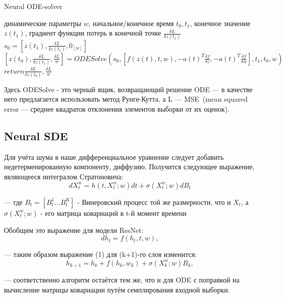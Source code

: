\documentclass{article}
\begin{document}
    \begin{algorithm}
     \caption{Neural ODE-solver}\label{alg:cap}
     \begin{algorithmic}
    \Require динамические параметры $w$, начальное/конечное время $t_0,t_1$, конечное значение $z(t_1)$, градиент функции потерь в конечной точке $\frac{\delta L}{\delta z(t_1)}$
    \State $s_0 = [z(t_1), \frac{\delta L}{\delta z(t_1)}, 0_{[w]}]$ 
    \State $[z(t_0), \frac{\delta L}{\delta z(t_1)}, \frac{\delta L}{w}] = ODESolve(s_0, [f(z(t), t, w), -a(t)^T \frac{\delta f}{\delta z}, -a(t)^T \frac{\delta f}{\delta w}], t_1, t_0, w)$
    \State $return \frac{\delta L}{\delta z(t_0)}, \frac{\delta L}{w}$ 
\end{algorithmic}
\end{algorithm}
   \par Здесь ODESolve - это черный ящик, возвращающий решение ODE --- в качестве него предлагается использовать метод Рунге-Кутта, а L --- MSE~(mean squared error --- среднее квадратов отклонения элементов выборки от их оценок).
    
   \subsection{Neural SDE}
      \par Для учёта шума в наше дифференциальное уравнение следует добавить недетерменированную компоненту, диффузию. Получится следующее выражение, являющееся интегралом Стратоновича:
      \begin{equation} dX_t^w = h(t, X_t^w; w) dt + \sigma(X_t^w;w) dB_t     \end{equation}
      \par --- где $B_t=[B_t^1...B_t^K]$ - Винеровский процесс той же размерности, что и $X_t$, а $\sigma(X_t^w;w)$ - его матрица ковариаций в t-й момент времени
      \par Обобщим это выражение для модели ResNet:
      \begin{equation}  dh_t = f(h_t, t, w),    \end{equation}
      \par --- таким образом выражение (1) для (k+1)-го слоя изменится:
      \begin{equation} h_{k+1} = h_k + f(h_k, w_k) +  \sigma(X_k^w;w) B_k,    \end{equation}
      \par --- соответственно алгоритм остаётся тем же, что и для ODE с поправкой на вычисление матрицы ковариации путём семплирования входной выборки.
\end{document}
